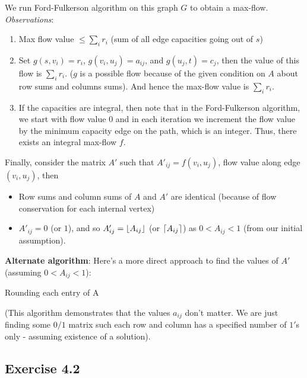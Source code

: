 \documentclass[12pt]{article}
\DeclarePairedDelimiter\floor{\lfloor}{\rfloor}
\DeclarePairedDelimiter\ceil{\lceil}{\rceil}
\begin{document}
We run Ford-Fulkerson algorithm on this graph $G$ to obtain a max-flow. \textsl{Observations}:
\begin{enumerate}
    \item Max flow value $\leq \sum_{i} r_i$ (sum of all edge capacities going out of $s$)
    \item Set $g(s,v_i)=r_i$, $g(v_i, u_j)=a_{ij}$, and $g(u_j, t)=c_j$, then the value of this flow is $\sum_{i} r_i$. ($g$ is a possible flow because of the given condition on $A$ about row sums and columns sums). And hence the max-flow value is $\sum_{i} r_i$.
    \item If the capacities are integral, then note that in the Ford-Fulkerson algorithm, we start with flow value $0$ and in each iteration we increment the flow value by the minimum capacity edge on the path, which is an integer. Thus, there exists an integral max-flow $f$.
\end{enumerate}

Finally, consider the matrix $A'$ such that $A'_{ij} = f(v_i,u_j)$, flow value along edge $(v_i, u_j)$, then
\begin{itemize}
    \item Row sums and column sums of $A$ and $A'$ are identical (because of flow conservation for each internal vertex)
    \item $A'_{ij} = 0$ (or $1$), and so $A'_{ij} = \floor{A_{ij}}$ (or $\ceil{A_{ij}}$) as $0 < A_{ij} < 1$ (from our initial assumption).
\end{itemize}

\textbf{Alternate algorithm}: Here's a more direct approach to find the values of $A'$ (assuming $0 < A_{ij} < 1$):

\begin{algorithm}[H]
\SetAlgoLined
{}
  {
 }
 \caption{Rounding each entry of A}
\end{algorithm}
(This algorithm demonstrates that the values $a_{ij}$ don't matter. We are just finding some $0/1$ matrix such each row and column has a specified number of $1'$s only - assuming existence of a solution).


\subsection*{Exercise 4.2}
\end{document}

